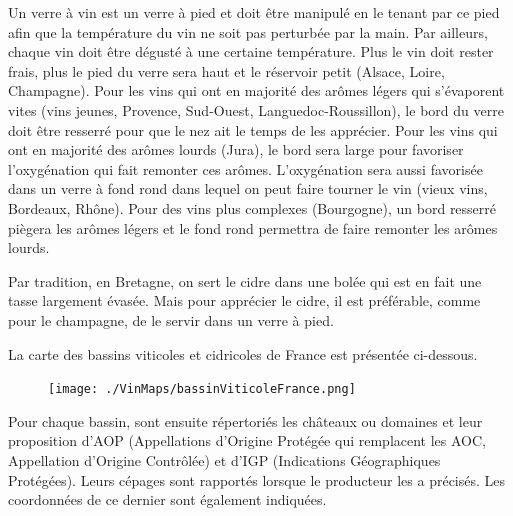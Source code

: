 Un verre à vin est un verre à pied et doit être manipulé en le tenant par ce pied afin que la température du vin ne soit pas perturbée par la main. Par ailleurs, chaque vin doit être dégusté à une certaine température. Plus le vin doit rester frais, plus le pied du verre sera haut et le réservoir petit (Alsace, Loire, Champagne). Pour les vins qui ont en majorité des arômes légers qui s’évaporent vites (vins jeunes, Provence, Sud-Ouest, Languedoc-Roussillon), le bord du verre doit être resserré pour que le nez ait le temps de les apprécier. Pour les vins qui ont en majorité des arômes lourds (Jura), le bord sera large pour favoriser l’oxygénation qui fait remonter ces arômes. L’oxygénation sera aussi favorisée dans un verre à fond rond dans lequel on peut faire tourner le vin (vieux vins, Bordeaux, Rhône). Pour des vins plus complexes (Bourgogne), un bord resserré piègera les arômes légers et le fond rond permettra de faire remonter les arômes lourds.
  
Par tradition, en Bretagne, on sert le cidre dans une bolée qui est en fait une tasse largement évasée. Mais pour apprécier le cidre, il est préférable, comme pour le champagne, de le servir dans un verre à pied.
  
La carte des bassins viticoles et cidricoles de France est présentée ci-dessous.
\begin{figure}[!t]
\texttt{[image: ./VinMaps/bassinViticoleFrance.png]}
\end{figure}
\newpage
Pour chaque bassin, sont ensuite répertoriés les châteaux ou domaines et leur proposition d’AOP (Appellations d’Origine Protégée qui remplacent les AOC, Appellation d’Origine Contrôlée) et d’IGP (Indications Géographiques Protégées). Leurs cépages sont rapportés lorsque le producteur les a précisés. Les coordonnées de ce dernier sont également indiquées.     
